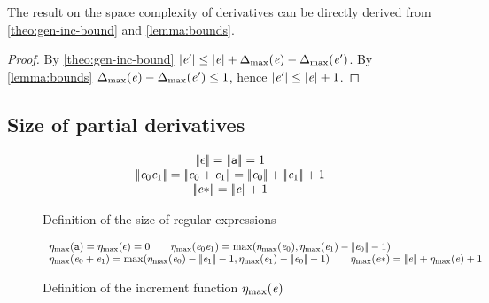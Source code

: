 The result on the space complexity of derivatives can be directly derived from  \cref{theo:gen-inc-bound} and \cref{lemma:bounds}.


\begin{proof}
 By \cref{theo:gen-inc-bound} ${\mid}{\mathit {e}'}{\mid}\leq{\mid}{\ensuremath{\mathit {e}}}{\mid}+{\Delta_{\max}}({\mathit {e}})-{\Delta_{\max}}({\mathit {e}'})$. By \cref{lemma:bounds}
 ${\Delta_{\max}}({\mathit {e}})-{\Delta_{\max}}({\mathit {e}'})\leq 1$, hence
 ${\mid}{\mathit {e}'}{\mid}\leq{\mid}{\ensuremath{\mathit {e}}}{\mid}+1$.
\end{proof}

\subsection{Size of partial derivatives}\label{sec:size}
\begin{figure}
 $$
  \begin{array}{c}
   \tsize{\eps}=\tsize{\sym}=1                                                    \\
   \tsize{\re_0\catop\re_1}=\tsize{\re_0\orop\re_1}=\tsize{\re_0}+\tsize{\re_1}+1 \\
   \tsize{\starop{\re}}=\tsize{\re}+1
  \end{array}
 $$
 \caption{Definition of the size of regular expressions}
 \label{fig:size}
\end{figure}

\begin{figure}
 $$
  \begin{array}{l}
   \incFunSize{\sym}=\incFunSize{\eps}=0                                      \qquad
   \incFunSize{\re_0\catop\re_1}=\max(\incFunSize{\re_0},\incFunSize{\re_1}-\tsize{\re_0}-1) \\
   \incFunSize{\re_0\orop\re_1}= \max(\incFunSize{\re_0}-\tsize{\re_1}-1,\incFunSize{\re_1}-\tsize{\re_0}-1)                                        \qquad
   \incFunSize{\starop{\re}}=\tsize{\re}+\incFunSize{\re}+1
  \end{array}
 $$
 \caption{Definition of the increment function ${\eta_{\max}}({\mathit {e}})$}
 \label{fig:incFunSize}
\end{figure}

